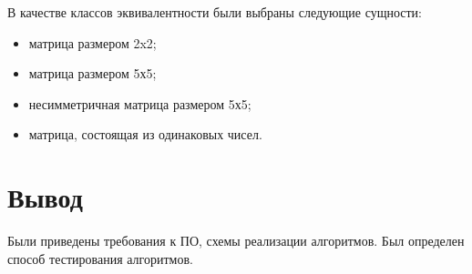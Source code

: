 В качестве классов эквивалентности были выбраны следующие сущности:
\begin{itemize}
	\item матрица размером 2x2;
	\item матрица размером 5х5;
	\item несимметричная матрица размером 5х5;
	\item матрица, состоящая из одинаковых чисел.
\end{itemize}

\section{Вывод}
Были приведены требования к ПО, схемы реализации алгоритмов.
Был определен способ тестирования алгоритмов.